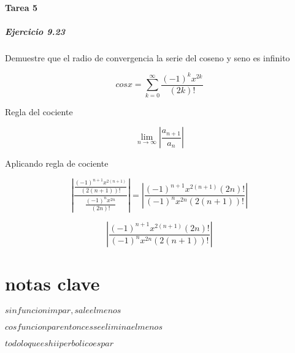 \documentclass[10pt,a4paper]{book}
\begin{document}
\paragraph{ Tarea 5}

\subparagraph{Ejercicio 9.23}
Demuestre que el radio de convergencia la serie del coseno y seno es infinito



\[cos x =\sum_{k=0}^{\infty} \frac{(-1)^k x^{2k}}{(2k)!}\]


Regla del cociente

\[\lim_{n \rightarrow \infty} |\frac{a_{n+1}}{a_n}| \]


Aplicando regla de cociente




\[| \frac{\frac{(-1)^{n+1} x^{2(n+1)}}{(2(n+1))!}}{\frac{(-1)^n x^{2n}}{(2n)!}} |  = | \frac{(-1)^{n+1} x^{2(n+1)} (2n)!}{(-1)^{n} x^{2n}(2(n+1))!} |\]

\[| \frac{(-1)^{n+1} x^{2(n+1)} (2n)!}{(-1)^{n} x^{2n}(2(n+1))!} |\]

\section{notas clave}

$sin funcion impar ,sale el menos$

$cos funcion par entonces se elimina el menos$

$todo lo que es hiiperbolico es par $
\end{document}
